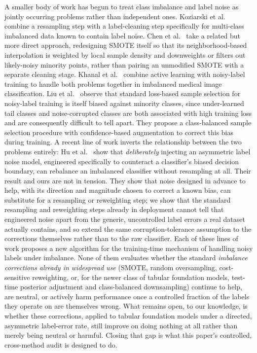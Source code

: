 A smaller body of work has begun to treat class imbalance and label noise as
jointly occurring problems rather than independent ones. Koziarski et
al.~\cite{koziarski2020ccr} combine a resampling step with a label-cleaning step
specifically for multi-class imbalanced data known to contain label noise.
Chen et al.~\cite{chen2021rsmote} take a related but more direct
approach, redesigning SMOTE itself so that its
neighborhood-based interpolation is weighted by local sample density and
downweights or filters out likely-noisy minority points, rather than pairing
an unmodified SMOTE with a separate cleaning stage. Khanal et
al.~\cite{khanal2024activelabel} combine active learning with
noisy-label training to handle both problems together in imbalanced medical
image classification. Liu et al.~\cite{liu2024imbalancednoisy} observe that
standard loss-based sample selection for noisy-label training is itself biased
against minority classes, since under-learned tail classes and noise-corrupted
classes are both associated with high training loss and are consequently
difficult to tell apart. They propose a class-balanced sample selection
procedure with confidence-based augmentation to correct this bias during
training. A recent line of work inverts the relationship between the two
problems entirely: Hu et al.~\cite{hu2025beneficialnoise} show that
\emph{deliberately} injecting an asymmetric label noise model, engineered
specifically to counteract a classifier's biased decision boundary, can
rebalance an imbalanced classifier without resampling at all. Their result
and ours are not in tension. They show that noise designed in advance to
help, with its direction and magnitude chosen to correct a known bias, can
substitute for a resampling or reweighting step; we show that the standard
resampling and reweighting steps already in deployment cannot tell that
engineered noise apart from the generic, uncontrolled label errors a real
dataset actually contains, and so extend the same corruption-tolerance
assumption to the corrections themselves rather than to the raw
classifier. Each of these lines of work proposes a new algorithm for the
training-time mechanism of handling noisy labels under imbalance. None of them
evaluates whether the standard \emph{imbalance corrections already in widespread use}
(SMOTE, random oversampling, cost-sensitive reweighting, or, for the newer
class of tabular foundation models, test-time posterior adjustment and
class-balanced downsampling) continue to help, are neutral, or actively harm
performance once a controlled fraction of the labels they operate on are
themselves wrong. What remains open, to our knowledge, is whether these
corrections, applied to tabular foundation models under a directed,
asymmetric label-error rate, still improve on doing nothing at all rather
than merely being neutral or harmful. Closing that gap is what this
paper's controlled, cross-method audit is designed to do.

